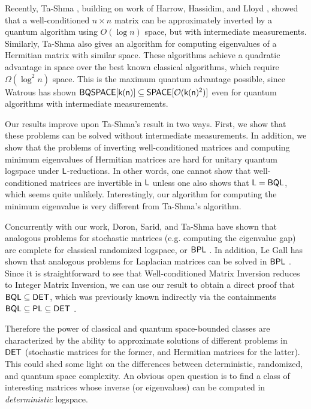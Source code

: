 \documentclass[11pt]{article}
\newcommand{\classfont}{\sf}
\numberwithin{lemma}{section}
\theoremstyle{definition}
\newcommand\BQSPACE{\sf{BQSPACE}}
\newcommand\DET{{\sf{DET}}}
\newcommand\Logspace{{\sf{L}}}
\newcommand\DSPACE{{\sf{SPACE}}}
\newcommand\bigoh{\mathcal{O}}
\newcommand\PLclass{{\sf{PL}}}
\newcommand{\BPL}{{\classfont{BPL}}}
\newcommand{\unitaryBQL}{{\classfont{BQL}}}
\begin{document}
Recently, Ta-Shma \cite{tashma}, building on work of Harrow, Hassidim, and Lloyd \cite{HHL}, showed that a well-conditioned $n \times n$ matrix can be approximately inverted by a quantum algorithm using $O(\log n)$ space, but with intermediate measurements. Similarly, Ta-Shma also gives an algorithm for computing eigenvalues of a Hermitian matrix with similar space. These algorithms achieve a quadratic advantage in space over the best known classical algorithms, which require $\Omega(\log^2n)$ space.  This is the maximum quantum advantage possible, since Watrous has shown $\BQSPACE[k(n)]\subseteq\DSPACE[\bigoh(k(n)^2)]$ \cite{Watrous99,Watrous03} even for quantum algorithms with intermediate measurements.

Our results improve upon Ta-Shma's result \cite{tashma} in two ways. First, %
we show that these problems can be solved without intermediate measurements.  In addition, we show that the problems of inverting well-conditioned matrices and computing minimum eigenvalues of Hermitian matrices are hard for unitary quantum logspace under $\Logspace$-reductions. In other words, one cannot show that well-conditioned matrices are invertible in $\Logspace$ unless one also shows that $\Logspace=\unitaryBQL$, which seems quite unlikely. Interestingly, our algorithm for computing the minimum eigenvalue is very different from Ta-Shma's algorithm.

Concurrently with our work, Doron, Sarid, and Ta-Shma have shown that analogous problems for stochastic matrices (e.g. computing the eigenvalue gap) are complete for classical randomized logspace, or $\BPL$ \cite{dt15,dst16}. In addition, Le Gall has shown that analogous problems for Laplacian matrices can be solved in $\BPL$ \cite{legall16}. Since it is straightforward to see that Well-conditioned Matrix Inversion reduces to Integer Matrix Inversion, we can use our result to obtain a direct proof that $\unitaryBQL\subseteq\DET$, which was previously known indirectly via the containments $\unitaryBQL\subseteq\PLclass\subseteq\DET$ \cite{Watrous03,Borodin84}.

Therefore the power of classical and quantum space-bounded classes are characterized by the ability to approximate solutions of different problems in $\DET$ (stochastic matrices for the former, and Hermitian matrices for the latter). This could shed some light on the differences between deterministic, randomized, and quantum space complexity. An obvious open question is to find a class of interesting matrices whose inverse (or eigenvalues) can be computed in \emph{deterministic} logspace.
\end{document}

